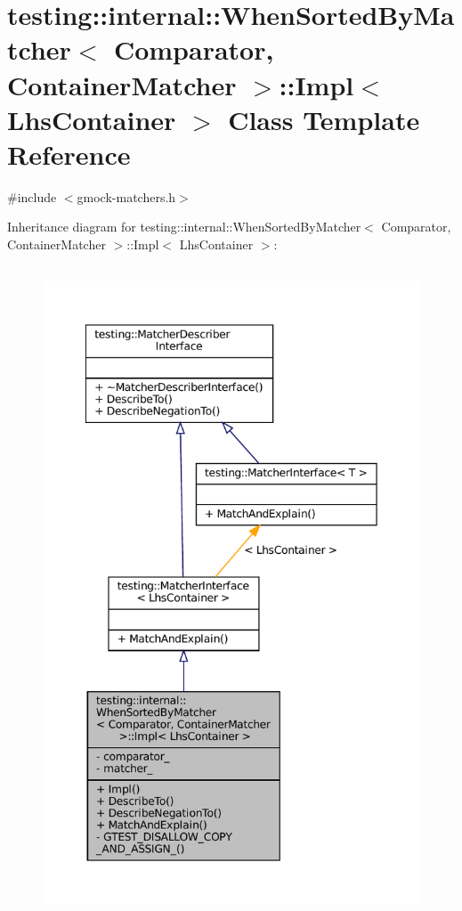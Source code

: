\hypertarget{classtesting_1_1internal_1_1WhenSortedByMatcher_1_1Impl}{}\section{testing\+:\+:internal\+:\+:When\+Sorted\+By\+Matcher$<$ Comparator, Container\+Matcher $>$\+:\+:Impl$<$ Lhs\+Container $>$ Class Template Reference}
\label{classtesting_1_1internal_1_1WhenSortedByMatcher_1_1Impl}


{\ttfamily \#include $<$gmock-\/matchers.\+h$>$}



Inheritance diagram for testing\+:\+:internal\+:\+:When\+Sorted\+By\+Matcher$<$ Comparator, Container\+Matcher $>$\+:\+:Impl$<$ Lhs\+Container $>$\+:
\nopagebreak
\begin{figure}[H]
\begin{center}
\leavevmode
\includegraphics[height=550pt]{classtesting_1_1internal_1_1WhenSortedByMatcher_1_1Impl__inherit__graph}
\end{center}
\end{figure}


